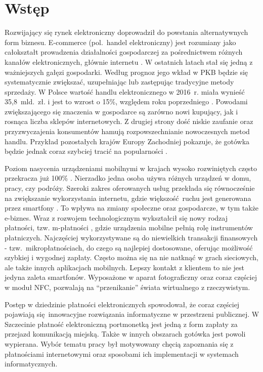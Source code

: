 \section*{Wstęp}

Rozwijający się rynek elektroniczny doprowadził do powstania alternatywnych form biznesu. E-commerce (pol.~handel elektroniczny) \cite{biblia_ebiznesu} jest rozumiany jako całokształt prowadzenia działalności gospodarczej za pośrednictwem różnych kanałów elektronicznych, głównie internetu \cite{pieniadz_elektroniczny-analiza}. W ostatnich latach stał się jedną z ważniejszych gałęzi gospodarki. Według prognoz jego wkład w PKB będzie się systematycznie zwiększać, uzupełniając lub zastępując tradycyjne metody sprzedaży. W Polsce wartość handlu elektronicznego w 2016~r. miała wynieść 35,8~mld.~zł. i jest to wzrost o 15\%, względem roku poprzedniego \cite{barometr_radio}. Powodami zwiększającego się znaczenia w gospodarce są zarówno nowi kupujący, jak i rosnąca liczba sklepów internetowych. Z drugiej strony dość niskie zaufanie oraz przyzwyczajenia konsumentów hamują rozpowszechnianie nowoczesnych metod handlu. Przykład pozostałych krajów Europy Zachodniej pokazuje, że gotówka będzie jednak coraz szybciej tracić na popularności \cite{pieniadz_elektroniczny-analiza}.

Poziom nasycenia urządzeniami mobilnymi w krajach wysoko rozwiniętych często przekracza już 100\% \cite{biblia_ebiznesu}. Nierzadko jedna osoba używa różnych urządzeń w domu, pracy, czy podróży. Szeroki zakres oferowanych usług przekłada się równocześnie na zwiększanie wykorzystania internetu, gdzie większość ruchu jest generowana przez smartfony \cite{ruch_mobilny-internet}. To wpływa na zmiany społeczne oraz gospodarcze, w tym także e-biznes. Wraz z rozwojem technologicznym wykształcił się nowy rodzaj płatności, tzw. m-płatności \cite{biblia_ebiznesu}, gdzie urządzenia mobilne pełnią rolę instrumentów płatniczych. Najczęściej wykorzystywane są do niewielkich transakcji finansowych - tzw.~mikropłatnościach, do czego są najlepiej dostosowane, oferując możliwość szybkiej i wygodnej zapłaty. Często można się na nie natknąć w grach sieciowych, ale także innych aplikacjach mobilnych. Lepszy kontakt z klientem to nie jest jedyna zaleta smartfonów. Wyposażone w aparat fotograficzny oraz coraz częściej w moduł NFC, pozwalają na ``przenikanie'' świata wirtualnego z rzeczywistym.

Postęp w dziedzinie płatności elektronicznych spowodował, że coraz częściej pojawiają się innowacyjne rozwiązania informatyczne w przestrzeni publicznej. W Szczecinie płatność elektroniczną portmonetką jest jedną z form zapłaty za przejazd komunikacją miejską. Także w innych obszarach gotówka jest powoli wypierana. Wybór tematu pracy był motywowany chęcią zapoznania się z płatnościami internetowymi oraz sposobami ich implementacji w systemach informatycznych.

